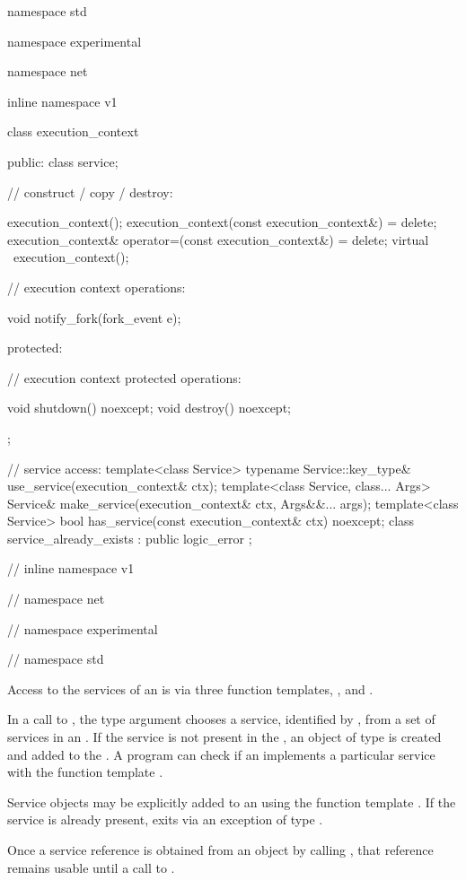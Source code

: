 \begin{codeblock}
namespace std {
namespace experimental {
namespace net {
inline namespace v1 {

  class execution_context
  {
  public:
    class service;

    // construct / copy / destroy:

    execution_context();
    execution_context(const execution_context&) = delete;
    execution_context& operator=(const execution_context&) = delete;
    virtual ~execution_context();

    // execution context operations:

    void notify_fork(fork_event e);

  protected:

    // execution context protected operations:

    void shutdown() noexcept;
    void destroy() noexcept;
  };

  // service access:
  template<class Service> typename Service::key_type&
    use_service(execution_context& ctx);
  template<class Service, class... Args> Service&
    make_service(execution_context& ctx, Args&&... args);
  template<class Service> bool has_service(const execution_context& ctx) noexcept;
  class service_already_exists : public logic_error { };

} // inline namespace v1
} // namespace net
} // namespace experimental
} // namespace std
\end{codeblock}

\pnum
Access to the services of an  is via three function templates, ,  and .

\pnum
In a call to , the type argument chooses a service, identified by , from a set of services in an . If the service is not present in the , an object of type  is created and added to the . A program can check if an  implements a particular service with the function template .

\pnum
Service objects may be explicitly added to an  using the function template . If the service is already present,  exits via an exception of type .

\pnum
Once a service reference is obtained from an  object by calling , that reference remains usable until a call to .

